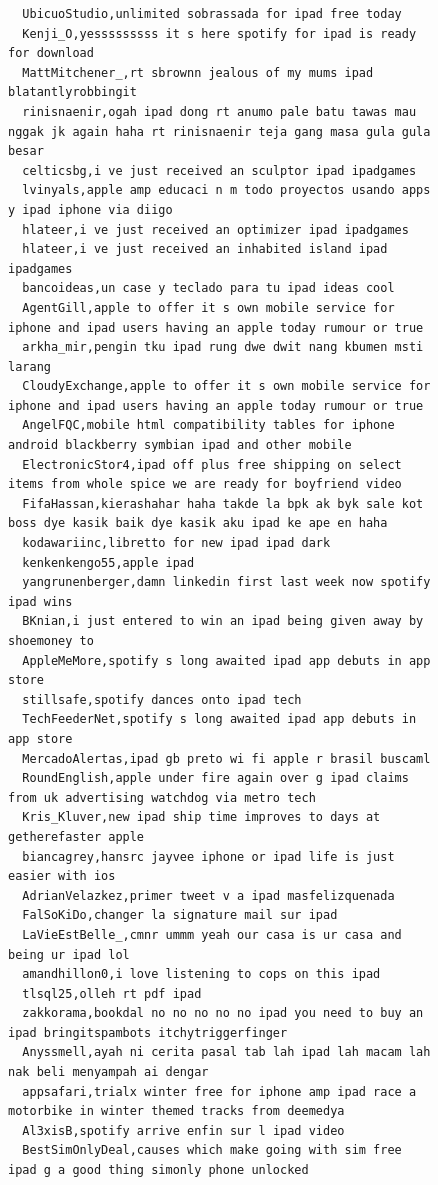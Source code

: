 \begin{figure}[htpb]
\begin{verbatim}
  UbicuoStudio,unlimited sobrassada for ipad free today
  Kenji_O,yesssssssss it s here spotify for ipad is ready for download
  MattMitchener_,rt sbrownn jealous of my mums ipad blatantlyrobbingit
  rinisnaenir,ogah ipad dong rt anumo pale batu tawas mau nggak jk again haha rt rinisnaenir teja gang masa gula gula besar
  celticsbg,i ve just received an sculptor ipad ipadgames
  lvinyals,apple amp educaci n m todo proyectos usando apps y ipad iphone via diigo
  hlateer,i ve just received an optimizer ipad ipadgames
  hlateer,i ve just received an inhabited island ipad ipadgames
  bancoideas,un case y teclado para tu ipad ideas cool
  AgentGill,apple to offer it s own mobile service for iphone and ipad users having an apple today rumour or true
  arkha_mir,pengin tku ipad rung dwe dwit nang kbumen msti larang
  CloudyExchange,apple to offer it s own mobile service for iphone and ipad users having an apple today rumour or true
  AngelFQC,mobile html compatibility tables for iphone android blackberry symbian ipad and other mobile
  ElectronicStor4,ipad off plus free shipping on select items from whole spice we are ready for boyfriend video
  FifaHassan,kierashahar haha takde la bpk ak byk sale kot boss dye kasik baik dye kasik aku ipad ke ape en haha
  kodawariinc,libretto for new ipad ipad dark
  kenkenkengo55,apple ipad
  yangrunenberger,damn linkedin first last week now spotify ipad wins
  BKnian,i just entered to win an ipad being given away by shoemoney to
  AppleMeMore,spotify s long awaited ipad app debuts in app store
  stillsafe,spotify dances onto ipad tech
  TechFeederNet,spotify s long awaited ipad app debuts in app store
  MercadoAlertas,ipad gb preto wi fi apple r brasil buscaml
  RoundEnglish,apple under fire again over g ipad claims from uk advertising watchdog via metro tech
  Kris_Kluver,new ipad ship time improves to days at getherefaster apple
  biancagrey,hansrc jayvee iphone or ipad life is just easier with ios
  AdrianVelazkez,primer tweet v a ipad masfelizquenada
  FalSoKiDo,changer la signature mail sur ipad
  LaVieEstBelle_,cmnr ummm yeah our casa is ur casa and being ur ipad lol
  amandhillon0,i love listening to cops on this ipad
  tlsql25,olleh rt pdf ipad
  zakkorama,bookdal no no no no no ipad you need to buy an ipad bringitspambots itchytriggerfinger
  Anyssmell,ayah ni cerita pasal tab lah ipad lah macam lah nak beli menyampah ai dengar
  appsafari,trialx winter free for iphone amp ipad race a motorbike in winter themed tracks from deemedya
  Al3xisB,spotify arrive enfin sur l ipad video
  BestSimOnlyDeal,causes which make going with sim free ipad g a good thing simonly phone unlocked

\end{verbatim}
\end{figure}
